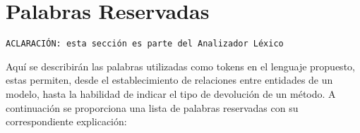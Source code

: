 \section{Palabras Reservadas}
\label{sec:palabrasreservadas}

\begin{center}
  \texttt{ACLARACIÓN: esta sección es parte del Analizador Léxico}\\
\end{center}

Aquí se describirán las palabras utilizadas como tokens en el lenguaje
propuesto, estas permiten, desde el establecimiento de relaciones
entre entidades de un modelo, hasta la habilidad de indicar el tipo de devolución
de un método. A continuación se proporciona una lista de palabras reservadas
con su correspondiente explicación:

